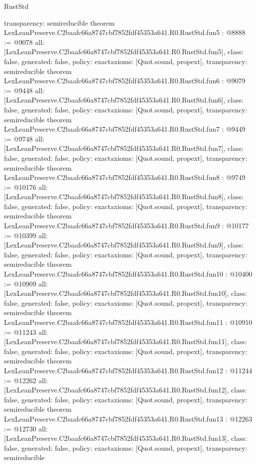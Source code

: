 \begin{lexlean}{RustStd}
\begin{coremodule}
{  transparency: semireducible
}
theorem LexLeanPreserve.C2baafc66a8747cbf7852fdf45353a641.R0.RustStd.fun5 : @8888 := @9078 {
  all: [LexLeanPreserve.C2baafc66a8747cbf7852fdf45353a641.R0.RustStd.fun5],
  class: false,
  generated: false,
  policy: exact{axioms: [Quot.sound, propext]},
  transparency: semireducible
}
theorem LexLeanPreserve.C2baafc66a8747cbf7852fdf45353a641.R0.RustStd.fun6 : @9079 := @9448 {
  all: [LexLeanPreserve.C2baafc66a8747cbf7852fdf45353a641.R0.RustStd.fun6],
  class: false,
  generated: false,
  policy: exact{axioms: [Quot.sound, propext]},
  transparency: semireducible
}
theorem LexLeanPreserve.C2baafc66a8747cbf7852fdf45353a641.R0.RustStd.fun7 : @9449 := @9748 {
  all: [LexLeanPreserve.C2baafc66a8747cbf7852fdf45353a641.R0.RustStd.fun7],
  class: false,
  generated: false,
  policy: exact{axioms: [Quot.sound, propext]},
  transparency: semireducible
}
theorem LexLeanPreserve.C2baafc66a8747cbf7852fdf45353a641.R0.RustStd.fun8 : @9749 := @10176 {
  all: [LexLeanPreserve.C2baafc66a8747cbf7852fdf45353a641.R0.RustStd.fun8],
  class: false,
  generated: false,
  policy: exact{axioms: [Quot.sound, propext]},
  transparency: semireducible
}
theorem LexLeanPreserve.C2baafc66a8747cbf7852fdf45353a641.R0.RustStd.fun9 : @10177 := @10399 {
  all: [LexLeanPreserve.C2baafc66a8747cbf7852fdf45353a641.R0.RustStd.fun9],
  class: false,
  generated: false,
  policy: exact{axioms: [Quot.sound, propext]},
  transparency: semireducible
}
theorem LexLeanPreserve.C2baafc66a8747cbf7852fdf45353a641.R0.RustStd.fun10 : @10400 := @10909 {
  all: [LexLeanPreserve.C2baafc66a8747cbf7852fdf45353a641.R0.RustStd.fun10],
  class: false,
  generated: false,
  policy: exact{axioms: [Quot.sound, propext]},
  transparency: semireducible
}
theorem LexLeanPreserve.C2baafc66a8747cbf7852fdf45353a641.R0.RustStd.fun11 : @10910 := @11243 {
  all: [LexLeanPreserve.C2baafc66a8747cbf7852fdf45353a641.R0.RustStd.fun11],
  class: false,
  generated: false,
  policy: exact{axioms: [Quot.sound, propext]},
  transparency: semireducible
}
theorem LexLeanPreserve.C2baafc66a8747cbf7852fdf45353a641.R0.RustStd.fun12 : @11244 := @12262 {
  all: [LexLeanPreserve.C2baafc66a8747cbf7852fdf45353a641.R0.RustStd.fun12],
  class: false,
  generated: false,
  policy: exact{axioms: [Quot.sound, propext]},
  transparency: semireducible
}
theorem LexLeanPreserve.C2baafc66a8747cbf7852fdf45353a641.R0.RustStd.fun13 : @12263 := @12730 {
  all: [LexLeanPreserve.C2baafc66a8747cbf7852fdf45353a641.R0.RustStd.fun13],
  class: false,
  generated: false,
  policy: exact{axioms: [Quot.sound, propext]},
  transparency: semireducible
}
\end{coremodule}
\end{lexlean}
